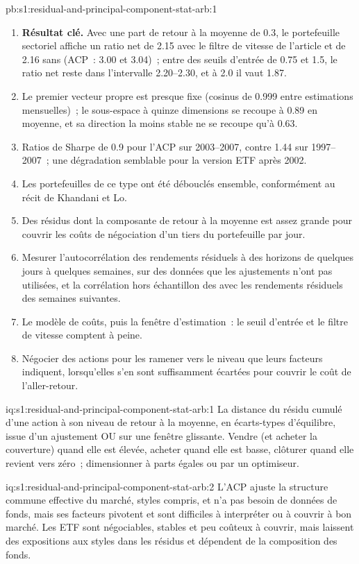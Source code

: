 \begin{solution}{pb:s1:residual-and-principal-component-stat-arb:1}
\begin{enumerate}
\item \textbf{Résultat clé.} Avec une part de retour à la moyenne de 0.3, le portefeuille sectoriel affiche un ratio net de 2.15 avec le filtre de vitesse de l'article et de 2.16 sans (ACP~: 3.00 et
3.04)~; entre des seuils d'entrée de 0.75 et 1.5, le ratio net reste dans l'intervalle 2.20--2.30, et à 2.0 il vaut 1.87.
\item Le premier vecteur propre est presque fixe (cosinus de 0.999 entre estimations mensuelles)~; le sous-espace à quinze dimensions se recoupe à 0.89 en moyenne, et sa direction la moins
stable ne se recoupe qu'à 0.63.
\item Ratios de Sharpe de 0.9 pour l'ACP sur 2003--2007, contre 1.44 sur 1997--2007~; une dégradation semblable pour la version ETF après 2002.
\item Les portefeuilles de ce type ont été débouclés ensemble, conformément au récit de Khandani et Lo.
\item Des résidus dont la composante de retour à la moyenne est assez grande pour couvrir les coûts de négociation d'un tiers du portefeuille par jour.
\item Mesurer l'autocorrélation des rendements résiduels à des horizons de quelques jours à quelques semaines, sur des données que les ajustements n'ont pas utilisées, et la corrélation hors échantillon des 
avec les rendements résiduels des semaines suivantes.
\item Le modèle de coûts, puis la fenêtre d'estimation~: le seuil d'entrée et le filtre de vitesse comptent à peine.
\item Négocier des actions pour les ramener vers le niveau que leurs facteurs indiquent, lorsqu'elles s'en sont suffisamment écartées pour couvrir le coût de l'aller-retour.
\end{enumerate}
\end{solution}

\begin{solution}{iq:s1:residual-and-principal-component-stat-arb:1}
La distance du résidu cumulé d'une action à son niveau de retour à la moyenne, en écarts-types d'équilibre, issue d'un ajustement OU sur une fenêtre glissante. Vendre
(et acheter la couverture) quand elle est élevée, acheter quand elle est basse, clôturer quand elle revient vers zéro~; dimensionner à parts égales ou par un optimiseur.
\end{solution}

\begin{solution}{iq:s1:residual-and-principal-component-stat-arb:2}
L'ACP ajuste la structure commune effective du marché, styles compris, et n'a pas besoin de données de fonds, mais ses facteurs pivotent et sont difficiles à interpréter ou à couvrir à bon marché.
Les ETF sont négociables, stables et peu coûteux à couvrir, mais laissent des expositions aux styles dans les résidus et dépendent de la composition des fonds.
\end{solution}

